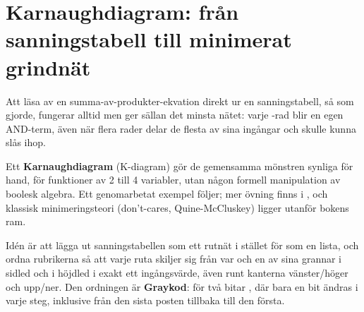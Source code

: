 
\section{Karnaughdiagram: från sanningstabell till minimerat grindnät}
\label{c2:sec:kmap}

Att läsa av en summa-av-produkter-ekvation direkt ur en sanningstabell, så som
 gjorde, fungerar alltid men ger sällan det minsta nätet: varje
-rad blir en egen AND-term, även när flera rader delar de flesta av sina ingångar och
skulle kunna slås ihop.

Ett \textbf{Karnaughdiagram} (K-diagram) gör de gemensamma mönstren synliga för hand, för
funktioner av 2 till 4 variabler, utan någon formell manipulation av boolesk algebra. Ett
genomarbetat exempel följer; mer övning finns i , och klassisk
minimeringsteori (don't-cares, Quine\--McCluskey) ligger utanför bokens ram.

Idén är att lägga ut sanningstabellen som ett rutnät i stället för som en lista, och ordna
rubrikerna så att varje ruta skiljer sig från var och en av sina grannar i sidled och i höjdled i
exakt ett ingångsvärde, även runt kanterna vänster/höger och upp/ner. Den ordningen är
\textbf{Graykod}: för två bitar , där bara en bit ändras i varje steg,
inklusive från den sista posten tillbaka till den första.

